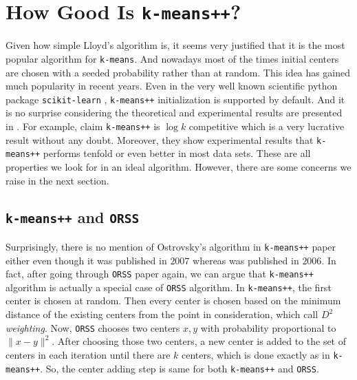 \documentclass[twoside, 11pt]{article}
\begin{document}
	\section{How Good Is \texttt{k-means++}?}\label{sec:kmeans++vsorss}
	Given how simple Lloyd's algorithm is, it seems very justified that it is the most popular algorithm for \texttt{k-means}. And nowadays most of the times initial centers are chosen with a seeded probability rather than at random. This idea has gained much popularity in recent years. Even in the very well known scientific python package \texttt{scikit-learn} \citep{sklearn}, \texttt{k-means++} initialization is supported by default. And it is no surprise considering the theoretical and experimental results are presented in \citep{kmeans++}. For example, \cite{kmeans++} claim \texttt{k-means++} is $\log{k}$ competitive which is a very lucrative result without any doubt. Moreover, they show experimental results that \texttt{k-means++} performs tenfold or even better in most data sets. These are all properties we look for in an ideal algorithm. However, there are some concerns we raise in the next section.
	\subsection{\texttt{k-means++} and \texttt{ORSS}}
	Surprisingly, there is no mention of Ostrovsky's algorithm in \texttt{k-means++} paper either even though it was published in $2007$ whereas \cite{ostrovsky} was published in $2006$. In fact, after going through \texttt{ORSS} paper again, we can argue that \texttt{k-means++} algorithm is actually a special case of \texttt{ORSS} algorithm. In \texttt{k-means++}, the first center is chosen at random. Then every center is chosen based on the minimum distance of the existing centers from the point in consideration, which \cite{kmeans++} call $D^2$ \textit{weighting}. Now, \texttt{ORSS} chooses two centers $x,y$ with probability proportional to $\|x-y\|^2$. After choosing those two centers, a new center is added to the set of centers in each iteration until there are $k$ centers, which is done exactly as in \texttt{k-means++}. So, the center adding step is same for both \texttt{k-means++} and \texttt{ORSS}.
	
\end{document}
